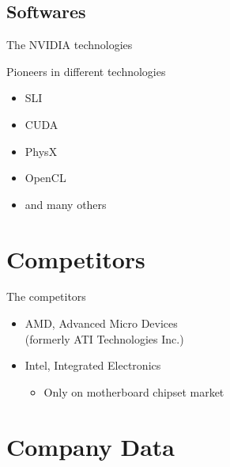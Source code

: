 \documentclass{beamer}
\begin{document}
\subsection{Softwares}
\begin{frame}{The NVIDIA technologies}
	\transdissolve[duration=0.1]
	\begin{block}{Pioneers in different technologies}
		\begin{itemize}
			\item<+->{SLI}
			\item<+->{CUDA}
			\item<+->{PhysX}
			\item<+->{OpenCL}
			\item<+->{and many others}
		\end{itemize}
	\end{block}
\end{frame}

\section{Competitors}
\begin{frame}{The competitors}
	\transdissolve[duration=0.1]
	\begin{block}{}
		\begin{itemize}
			\item<+->{AMD, Advanced Micro Devices \\(formerly ATI Technologies Inc.)}
		\end{itemize}

		\begin{itemize}
			\item<+->{Intel, Integrated Electronics}
			\begin{itemize}
				\item<+->{Only on motherboard chipset market}
			\end{itemize}
		\end{itemize}
	\end{block}
\end{frame}

\section{Company Data}
\end{document}

